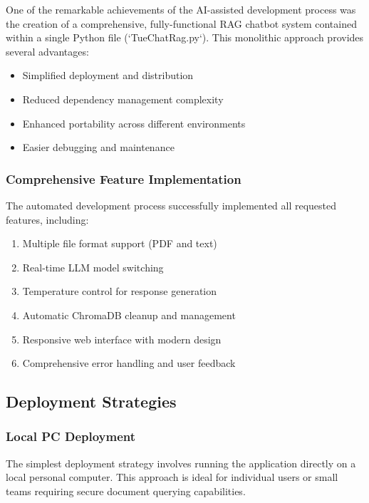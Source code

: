 One of the remarkable achievements of the AI-assisted development process was the creation of a comprehensive, fully-functional RAG chatbot system contained within a single Python file (`TueChatRag.py`). This monolithic approach provides several advantages:

\begin{itemize}
    \item Simplified deployment and distribution
    \item Reduced dependency management complexity
    \item Enhanced portability across different environments
    \item Easier debugging and maintenance
\end{itemize}

\subsubsection{Comprehensive Feature Implementation}

The automated development process successfully implemented all requested features, including:

\begin{enumerate}
    \item Multiple file format support (PDF and text)
    \item Real-time LLM model switching
    \item Temperature control for response generation
    \item Automatic ChromaDB cleanup and management
    \item Responsive web interface with modern design
    \item Comprehensive error handling and user feedback
\end{enumerate}

\subsection{Deployment Strategies}

\subsubsection{Local PC Deployment}

The simplest deployment strategy involves running the application directly on a local personal computer. This approach is ideal for individual users or small teams requiring secure document querying capabilities.

